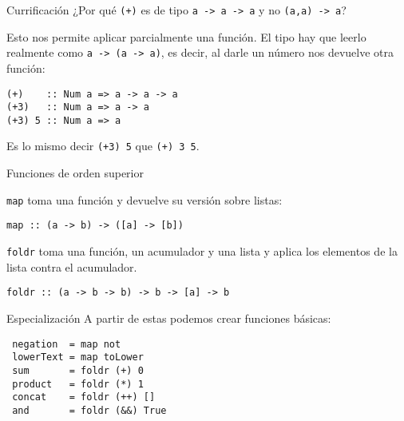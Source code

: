 \begin{frame}[fragile]{Currificación}
  ¿Por qué \texttt{(+)} es de tipo \texttt{\alert{a -> a} -> a}
  y no \texttt{\alert{(a,a)} -> a}?

  \espacio

  Esto nos permite aplicar parcialmente una función. El tipo hay que leerlo realmente como
  \texttt{a -> (a -> a)}, es decir, al darle un número nos devuelve otra función:
    \begin{lstlisting}
(+)    :: Num a => a -> a -> a
(+3)   :: Num a => a -> a
(+3) 5 :: Num a => a
  \end{lstlisting}
  Es lo mismo decir \texttt{(+3) 5} que \texttt{(+) 3 5}.

\end{frame}


\begin{frame}[fragile]{Funciones de orden superior}
\hypertarget{funcionesOrdenSup}{}

  \texttt{map} toma una función y devuelve su versión sobre listas:
  \begin{lstlisting}
map :: (a -> b) -> ([a] -> [b])
  \end{lstlisting}

  \espacio

  \texttt{foldr} toma una función, un acumulador y una lista
  y aplica los elementos de la lista contra el acumulador.
  \begin{lstlisting}
foldr :: (a -> b -> b) -> b -> [a] -> b
  \end{lstlisting}

\hfill\hyperlink{definiciones}{}

\end{frame}

\begin{frame}[fragile]{Especialización}
  A partir de estas podemos crear funciones básicas:

  \espacio

  \begin{lstlisting}
 negation  = map not
 lowerText = map toLower
 sum       = foldr (+) 0
 product   = foldr (*) 1
 concat    = foldr (++) []
 and       = foldr (&&) True
  \end{lstlisting}
  \espacio

\end{frame}

